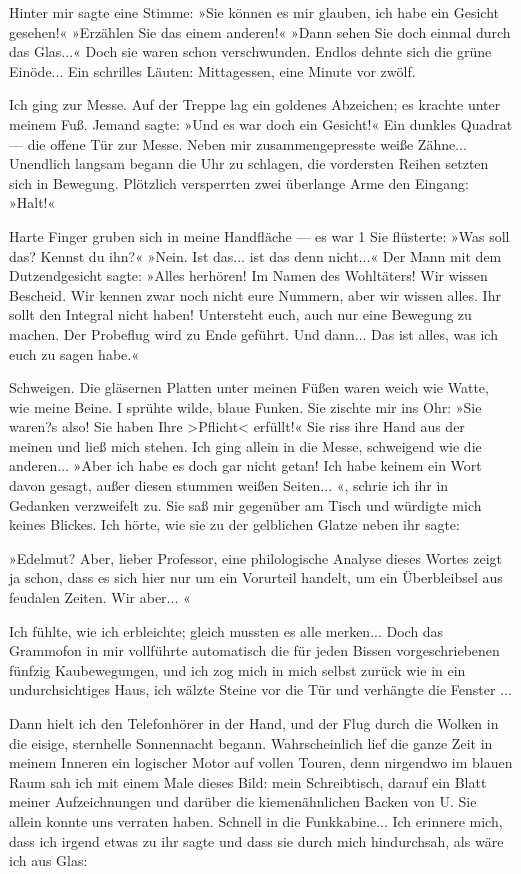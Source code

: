 Hinter mir sagte eine Stimme: »Sie können es mir glauben, ich habe
ein Gesicht gesehen!« »Erzählen Sie das einem anderen!« »Dann sehen
Sie doch einmal durch das Glas...« Doch sie waren schon
verschwunden. Endlos dehnte sich die grüne Einöde... Ein schrilles
Läuten: Mittagessen, eine Minute vor zwölf.

Ich ging zur Messe. Auf der Treppe lag ein goldenes Abzeichen; es
krachte unter meinem Fuß. Jemand sagte: »Und es war doch ein
Gesicht!« Ein dunkles Quadrat — die offene Tür zur Messe. Neben mir
zusammengepresste weiße Zähne... Unendlich langsam begann die Uhr
zu schlagen, die vordersten Reihen setzten sich in Bewegung.
Plötzlich versperrten zwei überlange Arme den Eingang: »Halt!«

Harte Finger gruben sich in meine Handfläche — es war 1 Sie
flüsterte: »Was soll das? Kennst du ihn?« »Nein. Ist das... ist das
denn nicht...« Der Mann mit dem Dutzendgesicht sagte: »Alles
herhören! Im Namen des Wohltäters! Wir wissen Bescheid. Wir kennen
zwar noch nicht eure Nummern, aber wir wissen alles. Ihr sollt den
Integral nicht haben! Untersteht euch, auch nur eine Bewegung zu
machen. Der Probeflug wird zu Ende geführt. Und dann... Das ist
alles, was ich euch zu sagen habe.«

Schweigen. Die gläsernen Platten unter meinen Füßen waren weich wie
Watte, wie meine Beine. I sprühte wilde, blaue Funken. Sie zischte
mir ins Ohr: »Sie waren?s also! Sie haben Ihre
\textgreater{}Pflicht\textless{} erfüllt!« Sie riss ihre Hand aus
der meinen und ließ mich stehen. Ich ging allein in die Messe,
schweigend wie die anderen... »Aber ich habe es doch gar nicht
getan! Ich habe keinem ein Wort davon gesagt, außer diesen stummen
weißen Seiten... «, schrie ich ihr in Gedanken verzweifelt zu. Sie
saß mir gegenüber am Tisch und würdigte mich keines Blickes. Ich
hörte, wie sie zu der gelblichen Glatze neben ihr sagte:

»Edelmut? Aber, lieber Professor, eine philologische Analyse dieses
Wortes zeigt ja schon, dass es sich hier nur um ein Vorurteil
handelt, um ein Überbleibsel aus feudalen Zeiten. Wir aber... «

Ich fühlte, wie ich erbleichte; gleich mussten es alle merken...
Doch das Grammofon in mir vollführte automatisch die für jeden
Bissen vorgeschriebenen fünfzig Kaubewegungen, und ich zog mich in
mich selbst zurück wie in ein undurchsichtiges Haus, ich wälzte
Steine vor die Tür und verhängte die Fenster ...

Dann hielt ich den Telefonhörer in der Hand, und der Flug durch die
Wolken in die eisige, sternhelle Sonnennacht begann. Wahrscheinlich
lief die ganze Zeit in meinem Inneren ein logischer Motor auf
vollen Touren, denn nirgendwo im blauen Raum sah ich mit einem Male
dieses Bild: mein Schreibtisch, darauf ein Blatt meiner
Aufzeichnungen und darüber die kiemenähnlichen Backen von U. Sie
allein konnte uns verraten haben. Schnell in die Funkkabine... Ich
erinnere mich, dass ich irgend etwas zu ihr sagte und dass sie
durch mich hindurchsah, als wäre ich aus Glas:


